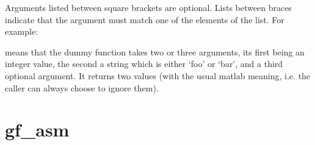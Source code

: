\documentclass[a4paper,11pt,english]{sphinxmanual}
\begin{document}
Arguments listed between square brackets are optional. Lists between braces indicate that the argument must match one of the elements of the list. For example:

\begin{sphinxVerbatim}[commandchars=\\\{\}]
 \PYG{p}{[}\PYG{p}{]}     \PYG{p}{[} \PYG{p}{]}
\end{sphinxVerbatim}

means that the dummy function takes two or three arguments, its first being an integer value, the second a string which is either ‘foo’ or ‘bar’, and a third optional argument. It returns two values (with the usual matlab meaning, i.e. the caller can always choose to ignore them).


\section{gf\_asm}
\label{\detokenize{matlab_octave/cmdref_gf_asm:gf-asm}}\label{\detokenize{matlab_octave/cmdref_gf_asm::doc}}
\end{document}
